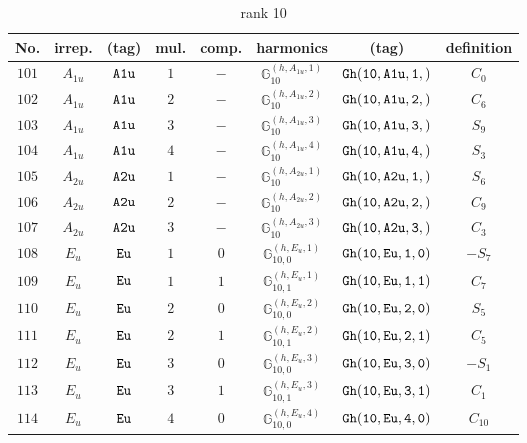 \documentclass[fleqn,8pt]{jsarticle}
\begin{document}
\begin{table}[ht!]
\begin{center}
\caption{rank 10}
\renewcommand{\arraystretch}{1.3}
\begin{tabular}{cccccccc} \hline \hline
No. & irrep. & (tag) & mul. & comp. & harmonics & (tag) & definition \\ \hline
$ 101 $ & $ A_{1u} $ & $ {\tt A1u} $ & $ 1 $ & $ - $ & $ \mathbb{G}_{10}^{(h,A_{1u},1)} $ & $ {\tt Gh(10,A1u,1,)} $ & $ C_{0} $ \\
$ 102 $ & $ A_{1u} $ & $ {\tt A1u} $ & $ 2 $ & $ - $ & $ \mathbb{G}_{10}^{(h,A_{1u},2)} $ & $ {\tt Gh(10,A1u,2,)} $ & $ C_{6} $ \\
$ 103 $ & $ A_{1u} $ & $ {\tt A1u} $ & $ 3 $ & $ - $ & $ \mathbb{G}_{10}^{(h,A_{1u},3)} $ & $ {\tt Gh(10,A1u,3,)} $ & $ S_{9} $ \\
$ 104 $ & $ A_{1u} $ & $ {\tt A1u} $ & $ 4 $ & $ - $ & $ \mathbb{G}_{10}^{(h,A_{1u},4)} $ & $ {\tt Gh(10,A1u,4,)} $ & $ S_{3} $ \\
$ 105 $ & $ A_{2u} $ & $ {\tt A2u} $ & $ 1 $ & $ - $ & $ \mathbb{G}_{10}^{(h,A_{2u},1)} $ & $ {\tt Gh(10,A2u,1,)} $ & $ S_{6} $ \\
$ 106 $ & $ A_{2u} $ & $ {\tt A2u} $ & $ 2 $ & $ - $ & $ \mathbb{G}_{10}^{(h,A_{2u},2)} $ & $ {\tt Gh(10,A2u,2,)} $ & $ C_{9} $ \\
$ 107 $ & $ A_{2u} $ & $ {\tt A2u} $ & $ 3 $ & $ - $ & $ \mathbb{G}_{10}^{(h,A_{2u},3)} $ & $ {\tt Gh(10,A2u,3,)} $ & $ C_{3} $ \\
$ 108 $ & $ E_{u} $ & $ {\tt Eu} $ & $ 1 $ & $ 0 $ & $ \mathbb{G}_{10,0}^{(h,E_{u},1)} $ & $ {\tt Gh(10,Eu,1,0)} $ & $ - S_{7} $ \\
$ 109 $ & $ E_{u} $ & $ {\tt Eu} $ & $ 1 $ & $ 1 $ & $ \mathbb{G}_{10,1}^{(h,E_{u},1)} $ & $ {\tt Gh(10,Eu,1,1)} $ & $ C_{7} $ \\
$ 110 $ & $ E_{u} $ & $ {\tt Eu} $ & $ 2 $ & $ 0 $ & $ \mathbb{G}_{10,0}^{(h,E_{u},2)} $ & $ {\tt Gh(10,Eu,2,0)} $ & $ S_{5} $ \\
$ 111 $ & $ E_{u} $ & $ {\tt Eu} $ & $ 2 $ & $ 1 $ & $ \mathbb{G}_{10,1}^{(h,E_{u},2)} $ & $ {\tt Gh(10,Eu,2,1)} $ & $ C_{5} $ \\
$ 112 $ & $ E_{u} $ & $ {\tt Eu} $ & $ 3 $ & $ 0 $ & $ \mathbb{G}_{10,0}^{(h,E_{u},3)} $ & $ {\tt Gh(10,Eu,3,0)} $ & $ - S_{1} $ \\
$ 113 $ & $ E_{u} $ & $ {\tt Eu} $ & $ 3 $ & $ 1 $ & $ \mathbb{G}_{10,1}^{(h,E_{u},3)} $ & $ {\tt Gh(10,Eu,3,1)} $ & $ C_{1} $ \\
$ 114 $ & $ E_{u} $ & $ {\tt Eu} $ & $ 4 $ & $ 0 $ & $ \mathbb{G}_{10,0}^{(h,E_{u},4)} $ & $ {\tt Gh(10,Eu,4,0)} $ & $ C_{10} $ \\

\end{tabular}
\end{center}
\end{table}
\end{document}
